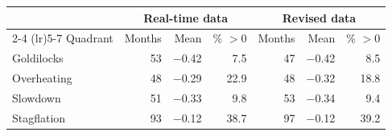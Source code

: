 \begin{tabular}{lrrrrrr}
\toprule
 & \multicolumn{3}{c}{Real-time data} & \multicolumn{3}{c}{Revised data} \\
\cmidrule(lr){2-4} \cmidrule(lr){5-7}
Quadrant & Months & Mean & \% $>0$ & Months & Mean & \% $>0$ \\
\midrule
Goldilocks & 53 & $-$0.42 & 7.5 & 47 & $-$0.42 & 8.5 \\
Overheating & 48 & $-$0.29 & 22.9 & 48 & $-$0.32 & 18.8 \\
Slowdown & 51 & $-$0.33 & 9.8 & 53 & $-$0.34 & 9.4 \\
Stagflation & 93 & $-$0.12 & 38.7 & 97 & $-$0.12 & 39.2 \\
\bottomrule
\end{tabular}
